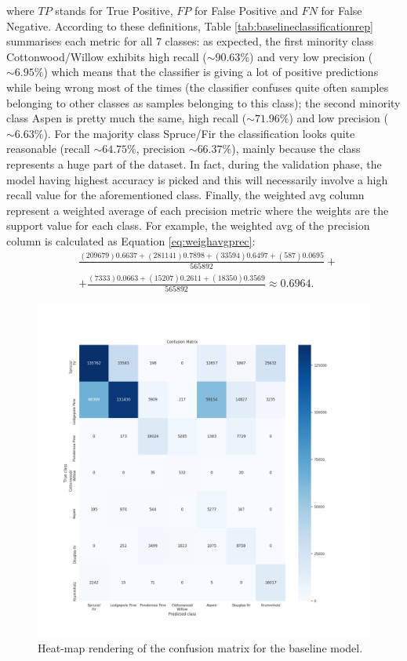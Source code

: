 where $TP$ stands for True Positive, $FP$ for False Positive and $FN$ for False Negative. According to these definitions, Table \ref{tab:baselineclassificationrep} summarises each metric for all $7$ classes: as expected, the first minority class Cottonwood/Willow exhibits high recall ($\sim90.63\%$) and very low precision ($\sim6.95\%$) which means that the classifier is giving a lot of positive predictions while being wrong most of the times (the classifier confuses quite often samples belonging to other classes as samples belonging to this class); the second minority class Aspen is pretty much the same, high recall ($\sim71.96\%$) and low precision ($\sim6.63\%$). For the majority class Spruce/Fir the classification looks quite reasonable (recall $\sim64.75\%$, precision $\sim66.37\%$), mainly because the class represents a huge part of the dataset. In fact, during the validation phase, the model having highest accuracy is picked and this will necessarily involve a high recall value for the aforementioned class. Finally, the weighted avg column represent a weighted average of each precision metric where the weights are the support value for each class. For example, the weighted avg of the precision column is calculated as Equation \ref{eq:weighavgprec}:
\begin{equation}
\label{eq:weighavgprec}
\begin{aligned}
&\frac{(209679)0.6637 + (281141)0.7898 + (33594)0.6497+(587)0.0695}{565892}+ \\
&+\frac{(7333)0.0663 + (15207)0.2611 + (18350)0.3569}{565892} \approx 0.6964.
\end{aligned}
\end{equation}
\begin{figure}
\centering
\includegraphics[width=\textwidth]{./TeX_files/img/baselineconfmatheatmap.png}
\caption{Heat-map rendering of the confusion matrix for the baseline model.}
\label{fig:baselineconfmatheatmap}
\end{figure}
